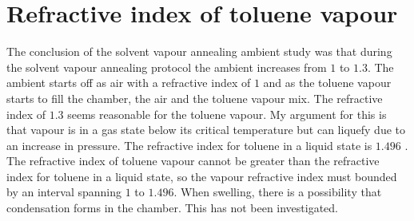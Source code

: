 \documentclass[MasterThesisMain.tex]{subfiles}
\begin{document}
\section{Refractive index of toluene vapour}   
The conclusion of the solvent vapour annealing ambient study was that during the solvent vapour annealing protocol the ambient increases from $1$ to $1.3$. The ambient starts off as air with a refractive index of $1$ and as the toluene vapour starts to fill the chamber, the air and the toluene vapour mix. The refractive index of $1.3$ seems reasonable for the toluene vapour. My argument for this is that vapour is in a gas state below its critical temperature but can liquefy due to an increase in pressure. The refractive index for toluene in a liquid state is $1.496$ \cite{toluene}. The refractive index of toluene vapour cannot be greater than the refractive index for toluene in a liquid state, so the vapour refractive index must bounded by an interval spanning $1$ to $1.496$. When swelling, there is a possibility that condensation forms in the chamber. This has not been investigated.  
\end{document}
